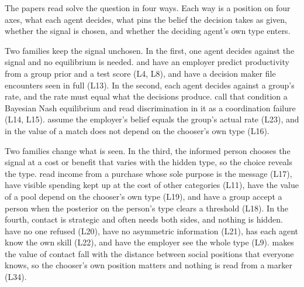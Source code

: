 The papers read solve the question in four ways. Each way is a position on
four axes, what each agent decides, what pins the belief the decision takes
as given, whether the signal is chosen, and whether the deciding agent's own
type enters.

Two families keep the signal unchosen. In the first, one agent decides
against the signal and no equilibrium is needed. \citet{Phelps1972} and
\citet{AignerCain1977} have an employer predict productivity from a group
prior and a test score (L4, L8), and \citet{FryerJackson2008} have a
decision maker file encounters seen in full (L13). In the second, each agent
decides against a group's rate, and the rate must equal what the decisions
produce. \citet{FangMoro2010} call that condition a Bayesian Nash
equilibrium and read discrimination in it as a coordination failure (L14,
L15). \citet{KimLoury2014} assume the employer's belief equals the group's
actual rate (L23), and in \citet{CraigFryer2017} the value of a match does
not depend on the chooser's own type (L16).

Two families change what is seen. In the third, the informed person chooses
the signal at a cost or benefit that varies with the hidden type, so the
choice reveals the type. \citet{CorneoJeanne1994} read income from a
purchase whose sole purpose is the message (L17), \citet{CharlesEtAl2007}
have visible spending kept up at the cost of other categories (L11),
\citet{Pesendorfer1995} have the value of a pool depend on the chooser's own
type (L19), and \citet{AustenSmithFryer2003} have a group accept a person
when the posterior on the person's type clears a threshold (L18). In the
fourth, contact is strategic and often needs both sides, and nothing is
hidden. \citet{CurrariniEtAl2008} have no one refused (L20),
\citet{MailathPostlewaite2006} have no asymmetric information (L21),
\citet{Eguia2013} has each agent know the own skill (L22), and
\citet{PeskiSzentes2012} have the employer see the whole type (L9).
\citet{Akerlof1997} makes the value of contact fall with the distance
between social positions that everyone knows, so the chooser's own position matters
and nothing is read from a marker (L34).

